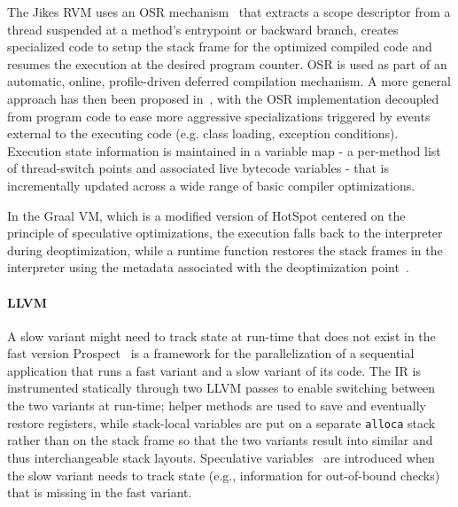 The Jikes RVM uses an OSR mechanism~\cite{fink2003design} that extracts a scope descriptor from a thread suspended at a method's entrypoint or backward branch, creates specialized code to setup the stack frame for the optimized compiled code and resumes the execution at the desired program counter. OSR is used as part of an automatic, online, profile-driven deferred compilation mechanism. A more general approach has then been proposed in~\cite{soman2006efficient}, with the OSR implementation decoupled from program code to ease more aggressive specializations triggered by events external to the executing code (e.g. class loading, exception conditions). Execution state information is maintained in a variable map - a per-method list of thread-switch points and associated live bytecode variables - that is incrementally updated across a wide range of basic compiler optimizations.

In the Graal VM, which is a modified version of HotSpot centered on the principle of speculative optimizations, the execution falls back to the interpreter during deoptimization, while a runtime function restores the stack frames in the interpreter using the metadata associated with the deoptimization point~\cite{duboscq2013graal,wurthinger2013truffle,duboscq2014metadata}.


\paragraph{LLVM}
A slow variant might need to track state at run-time that does not exist in the fast version
Prospect~\cite{susskraut2010prospect} is a framework for the parallelization of a sequential application that runs a fast variant and a slow variant of its code. The IR is instrumented statically through two LLVM passes to enable switching between the two variants at run-time; helper methods are used to save and eventually restore registers, while stack-local variables are put on a separate {\tt alloca} stack rather than on the stack frame so that the two variants result into similar and thus interchangeable stack layouts. Speculative variables~\cite{susskraut2009speculation} are introduced when the slow variant needs to track state (e.g., information for out-of-bound checks) that is missing in the fast variant.

\cite{detlefs2001method,lameed2013modular,steiner2007adaptive,chambers1992design}

  
  
  
  
  
  
  
  
  
  
  
  
  
  
  
